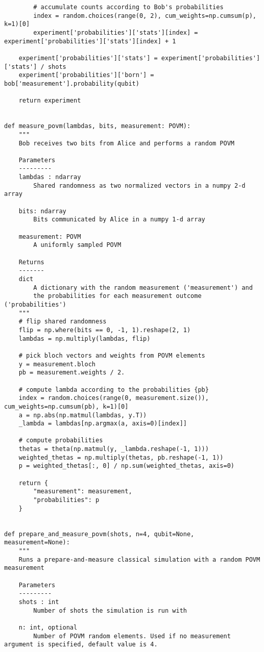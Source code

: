 \begin{verbatim}
        # accumulate counts according to Bob's probabilities
        index = random.choices(range(0, 2), cum_weights=np.cumsum(p), k=1)[0]
        experiment['probabilities']['stats'][index] = experiment['probabilities']['stats'][index] + 1

    experiment['probabilities']['stats'] = experiment['probabilities']['stats'] / shots
    experiment['probabilities']['born'] = bob['measurement'].probability(qubit)

    return experiment


def measure_povm(lambdas, bits, measurement: POVM):
    """
    Bob receives two bits from Alice and performs a random POVM

    Parameters
    ---------
    lambdas : ndarray
        Shared randomness as two normalized vectors in a numpy 2-d array

    bits: ndarray
        Bits communicated by Alice in a numpy 1-d array

    measurement: POVM
        A uniformly sampled POVM

    Returns
    -------
    dict
        A dictionary with the random measurement ('measurement') and
        the probabilities for each measurement outcome ('probabilities')
    """
    # flip shared randomness
    flip = np.where(bits == 0, -1, 1).reshape(2, 1)
    lambdas = np.multiply(lambdas, flip)

    # pick bloch vectors and weights from POVM elements
    y = measurement.bloch
    pb = measurement.weights / 2.

    # compute lambda according to the probabilities {pb}
    index = random.choices(range(0, measurement.size()), cum_weights=np.cumsum(pb), k=1)[0]
    a = np.abs(np.matmul(lambdas, y.T))
    _lambda = lambdas[np.argmax(a, axis=0)[index]]

    # compute probabilities
    thetas = theta(np.matmul(y, _lambda.reshape(-1, 1)))
    weighted_thetas = np.multiply(thetas, pb.reshape(-1, 1))
    p = weighted_thetas[:, 0] / np.sum(weighted_thetas, axis=0)

    return {
        "measurement": measurement,
        "probabilities": p
    }


def prepare_and_measure_povm(shots, n=4, qubit=None, measurement=None):
    """
    Runs a prepare-and-measure classical simulation with a random POVM measurement

    Parameters
    ---------
    shots : int
        Number of shots the simulation is run with

    n: int, optional
        Number of POVM random elements. Used if no measurement argument is specified, default value is 4.


\end{verbatim}
